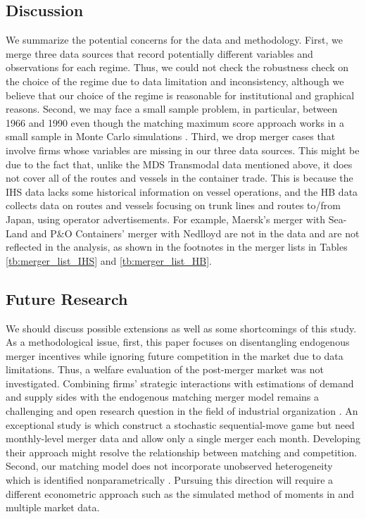 \documentclass[10pt]{article}
\begin{document}
\subsection{Discussion}
We summarize the potential concerns for the data and methodology. 
First, we merge three data sources that record potentially different variables and observations for each regime. 
Thus, we could not check the robustness check on the choice of the regime due to data limitation and inconsistency, although we believe that our choice of the regime is reasonable for institutional and graphical reasons.
Second, we may face a small sample problem, in particular, between 1966 and 1990 even though the matching maximum score approach works in a small sample in Monte Carlo simulations \citep{akkus2015ms,otani2021matching_cost}.
Third, we drop merger cases that involve firms whose variables are missing in our three data sources. 
This might be due to the fact that, unlike the MDS Transmodal data mentioned above, it does not cover all of the routes and vessels in the container trade. This is because the IHS data lacks some historical information on vessel operations, and the HB data collects data on routes and vessels focusing on trunk lines and routes to/from Japan, using operator advertisements. For example, Maersk's merger with Sea-Land and P\&O Containers' merger with Nedlloyd are not in the data and are not reflected in the analysis, as shown in the footnotes in the merger lists in Tables \ref{tb:merger_list_IHS} and \ref{tb:merger_list_HB}.


\subsection{Future Research}

We should discuss possible extensions as well as some shortcomings of this study. 
As a methodological issue, first, this paper focuses on disentangling endogenous merger incentives while ignoring future competition in the market due to data limitations. 
Thus, a welfare evaluation of the post-merger market was not investigated.
Combining firms' strategic interactions with estimations of demand and supply sides with the endogenous matching merger model remains a challenging and open research question in the field of industrial organization \citep{agarwal2021market}. 
An exceptional study is \cite{igami2019mergers} which construct a stochastic sequential-move game but need monthly-level merger data and allow only a single merger each month. 
Developing their approach might resolve the relationship between matching and competition.
Second, our matching model does not incorporate unobserved heterogeneity which is identified nonparametrically \citep{fox2018jpe}.
Pursuing this direction will require a different econometric approach such as the simulated method of moments in \cite{fox2018jpe} and multiple market data. 
\end{document}
